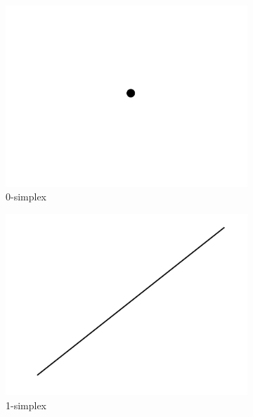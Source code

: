 \begin{figure}[ht]
    \centering
    \begin{subfigure}[b]{0.2\textwidth}
        \centering
        \includegraphics[width=\textwidth]{report/Images/Theory/simplices/simplices0.png}
        \caption{0-simplex}
        \label{fig:0-simplex}
    \end{subfigure}
    \hfill
    \begin{subfigure}[b]{0.2\textwidth}
        \centering
        \includegraphics[width=\textwidth]{report/Images/Theory/simplices/simplices1.png}
        \caption{1-simplex}
        \label{fig:1-simplex}
    \end{subfigure}
    \hfill
    \begin{subfigure}[b]{0.2\textwidth}

\end{subfigure}
\end{figure}
